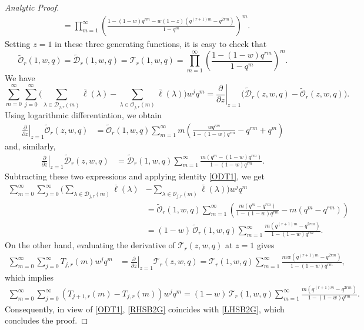 \documentclass[reqno,12pt]{amsart}
\theoremstyle{definition}
\def\del{\partial}
\begin{document}
\begin{proof}[Analytic Proof]
\begin{align*}
&=\prod_{m=1}^{\infty}\left(\frac{1-(1-w)q^{rm}-w(1-z)(q^{(r+1)m}-q^{2rm})}{1-q^{m}}\right)^m.
\end{align*} 
Setting $z=1$ in these three generating functions, it is easy to check that  
\begin{equation}\label{ODT1}
\widetilde{\mathcal O}_r(1,w,q)
=\widetilde{\mathcal D}_r(1,w,q)
={\mathcal T}_r(1,w,q)
=\prod_{m=1}^{\infty}\left(\frac{1-(1-w)q^{rm}}{1-q^{m}}\right)^m.
\end{equation}
We have 
$$\sum_{m=0}^\infty\sum_{j=0}^\infty \Big(\sum_{\lambda\in\mathcal{D}_{j,r}(m)}\bar{\ell}(\lambda)-
\sum_{\lambda\in\mathcal{O}_{j,r}(m)}\bar{\ell}(\lambda)\Big)w^jq^m 
= \left.\frac{\del}{\del z}\right|_{z=1}\!\!\!\!\!\!\bigl(\widetilde{\mathcal D}_r(z,w,q)-\widetilde{\mathcal O}_r(z,w,q)\bigr).$$
Using logarithmic differentiation, we obtain
\begin{align*}\left.\frac{\del}{\del z}\right|_{z=1}\!\!\!\!\!\!\widetilde{\mathcal O}_r(z,w,q)
&=\widetilde{\mathcal O}_r(1,w,q)\sum_{m=1}^\infty m\left(
\frac{wq^{rm}}{1-(1-w)q^{rm}}-q^{rm}+q^{m}\right)
\end{align*}
and, similarly,
\begin{align*}
\left.\frac{\del}{\del z}\right|_{z=1}\!\!\!\!\!\!\widetilde{\mathcal D}_r(z,w,q)
&= \widetilde{\mathcal D}_r(1,w,q)
\sum_{m=1}^\infty \frac{m(q^m-(1-w)q^{rm})}{1-(1-w)q^{rm}}.
\end{align*}
Subtracting these two expressions and applying identity \eqref{ODT1}, we get
\begin{align}\label{RHSB2G}
\sum_{m=0}^\infty\sum_{j=0}^\infty \Big(\sum_{\lambda\in\mathcal{D}_{j,r}(m)}\bar{\ell}(\lambda)&-
\sum_{\lambda\in\mathcal{O}_{j,r}(m)}\bar{\ell}(\lambda)\Big)w^jq^m\nonumber\\
&=\widetilde{\mathcal O}_r(1,w,q)
\sum_{m=1}^{\infty} 
\left(\frac{m(q^m-q^{rm})}{1-(1-w)q^{rm}}-m(q^m-q^{rm})\right)\nonumber\\
&=(1-w)\,\widetilde{\mathcal O}_r(1,w,q)
\sum_{m=1}^\infty \frac{m(q^{(r+1)m}-q^{2rm})}{1-(1-w)q^{rm}}.
\end{align}
On the other hand, evaluating the derivative of ${\mathcal T}_r(z,w,q)$ at $z=1$ gives
\begin{align*}
\sum_{m=0}^\infty\sum_{j=0}^\infty T_{j,r}(m)w^jq^m
&=\left.\frac{\del}{\del z}\right|_{z=1}\!\!\!\!\!\!{\mathcal T}_r(z,w,q)={\mathcal T}_r(1,w,q)
\sum_{m=1}^{\infty}\frac{mw(q^{(r+1)m}-q^{2rm})}{1-(1-w)q^{rm}},
\end{align*}
which implies 
\begin{align}\label{LHSB2G}
\sum_{m=0}^\infty\sum_{j=0}^{\infty} ({T}_{j+1,r}(m)-{T}_{j,r}(m)) w^jq^m=(1-w)\,{\mathcal T}_r(1,w,q)
\sum_{m=1}^\infty \frac{m(q^{(r+1)m}-q^{2rm})}{1-(1-w)q^{rm}}.
\end{align}
Consequently, in view of \eqref{ODT1}, \eqref{RHSB2G} coincides with \eqref{LHSB2G}, which concludes the proof.
\end{proof}
\end{document}
